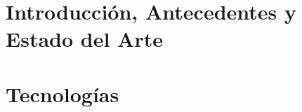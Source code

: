\documentclass[spanish,a4paper,12pt,oneside]{extreport}
\begin{document}
\pagestyle{myheadings} %



\renewcommand{\thepage}{\roman{page}}
\setcounter{page}{1}
\pagestyle{plain} 


{\hypersetup{linkcolor=black}
\tableofcontents

\newpage{\pagestyle{empty}}

\listoffigures

\newpage{\pagestyle{empty}}

\listoftables
}

\newpage{\pagestyle{empty}}

\newpage
\thispagestyle{empty}

\renewcommand{\thepage}{\arabic{page}}
\setcounter{page}{1}
\pagestyle{plain}

\chapter{\LARGE Introducción, Antecedentes y Estado del Arte}
\label{chapter:intro}



\newpage{\pagestyle{empty}}
\thispagestyle{empty}

\chapter{\LARGE Tecnologías}
\label{chapter:dos}



\newpage{\pagestyle{empty}}
\thispagestyle{empty}
\end{document}
